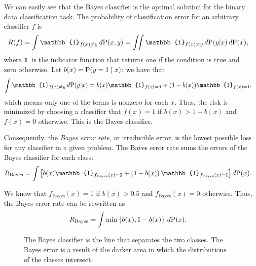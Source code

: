 We can easily see that the Bayes classifier is the optimal solution for the binary data
classification task.  The probability of classification error for an arbitrary classifier
$f$ is
\begin{equation*}
  R(f) = \int \mathbb{1}_{f(x) \neq y}\, d\!\Prob(x, y) =
    \iint \mathbb{1}_{f(x) \neq y}\, d\!\Prob(y | x)\, d\!\Prob(x)\text{,}
\end{equation*}
where $\mathbb{1}_{\cdot}$ is the indicator function that returns one if the condition is
true and zero otherwise.  Let $b(x) = \operatorname{P}(y = 1 \mid x)$; we have that
\[
  \int \mathbb{1}_{f(x) \neq y}\, d\!\Prob(y | x) =
    b(x) \mathbb{1}_{f(x) = 0} + (1 - b(x)) \mathbb{1}_{f(x) = 1}\text{,}
\]
which means only one of the terms is nonzero for each $x$.  Thus, the risk is minimized by choosing
a classifier that $f(x) = 1$ if $b(x) > 1 - b(x)$ and $f(x) = 0$ otherwise.  This is the
Bayes classifier.

Consequently, the \emph{Bayes error rate}, or irreducible error, is the lowest possible loss for any
classifier in a given problem.  The Bayes error rate sums the errors of the
Bayes classifier for each class:
\begin{equation*}
  R_\text{Bayes} = \int \left[
    b(x) \mathbb{1}_{f_\text{Bayes}(x) = 0} +
    \left(1 - b(x)\right) \mathbb{1}_{f_\text{Bayes}(x) = 1}
  \right] d\!\Prob(x)\text{.}
\end{equation*}

We know that $f_\text{Bayes}(x) = 1$ if $b(x) > 0.5$ and $f_\text{Bayes}(x) = 0$ otherwise.
Thus, the Bayes error rate can be rewritten as
\begin{equation*}
  R_\text{Bayes} = \int \min\left\{ b(x), 1 - b(x) \right\}\, d\!\operatorname{P}(x)\text{.}
\end{equation*}

\begin{figure}
  \centering
  \caption{
  The Bayes classifier is the line that separates the two classes.  The Bayes error is a
  result of the darker area in which the distributions of the classes intersect.
  }
  \label{fig:bayes-classifier}
\end{figure}

